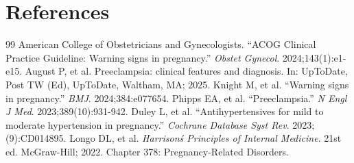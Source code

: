 \section*{References}
\begin{thebibliography}{99}
 American College of Obstetricians and Gynecologists. ``ACOG Clinical Practice Guideline: Warning signs in pregnancy.'' \emph{Obstet Gynecol}. 2024;143(1):e1-e15.
 August P, et al. Preeclampsia: clinical features and diagnosis. In: UpToDate, Post TW (Ed), UpToDate, Waltham, MA; 2025.
 Knight M, et al. ``Warning signs in pregnancy.'' \emph{BMJ}. 2024;384:e077654.
 Phipps EA, et al. ``Preeclampsia.'' \emph{N Engl J Med}. 2023;389(10):931-942.
 Duley L, et al. ``Antihypertensives for mild to moderate hypertension in pregnancy.'' \emph{Cochrane Database Syst Rev}. 2023;(9):CD014895.
 Longo DL, et al. \emph{Harrison\'s Principles of Internal Medicine}. 21st ed. McGraw-Hill; 2022. Chapter 378: Pregnancy-Related Disorders.
\end{thebibliography}
